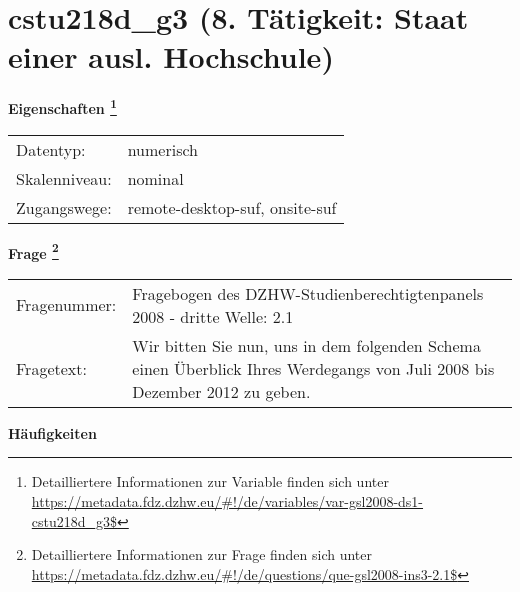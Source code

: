 
    \setcounter{footnote}{0}

    \vspace*{-1.8cm}
	\section{cstu218d\_g3 (8. Tätigkeit: Staat einer ausl. Hochschule)}
	\label{section:cstu218d_g3}



    \vspace*{0.5cm}
    \noindent\textbf{Eigenschaften
	\footnote{Detailliertere Informationen zur Variable finden sich unter
		\url{https://metadata.fdz.dzhw.eu/\#!/de/variables/var-gsl2008-ds1-cstu218d_g3$}}}\\
	\begin{tabularx}{\hsize}{@{}lX}
	Datentyp: & numerisch \\
	Skalenniveau: & nominal \\
	Zugangswege: &
	  remote-desktop-suf, 
	  onsite-suf
 \\
    \end{tabularx}



				\vspace*{0.5cm}
                \noindent\textbf{Frage
	                \footnote{Detailliertere Informationen zur Frage finden sich unter
		              \url{https://metadata.fdz.dzhw.eu/\#!/de/questions/que-gsl2008-ins3-2.1$}}}\\
				\begin{tabularx}{\hsize}{@{}lX}
					Fragenummer: &
					  Fragebogen des DZHW-Studienberechtigtenpanels 2008 - dritte Welle:
					  2.1
 \\
					Fragetext: & Wir bitten Sie nun, uns in dem folgenden Schema einen Überblick Ihres Werdegangs von Juli 2008 bis Dezember 2012 zu geben. \\
				\end{tabularx}





        		\vspace*{0.5cm}
                \noindent\textbf{Häufigkeiten}

